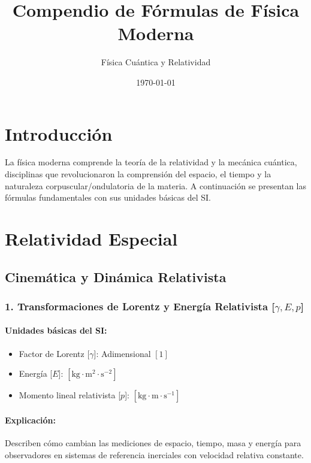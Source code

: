 \documentclass[12pt,a4paper]{article}
\title{\textbf{Compendio de Fórmulas de Física Moderna}}
\author{Física Cuántica y Relatividad}
\date{\today}
\begin{document}
\maketitle

\section*{Introducción}
La física moderna comprende la teoría de la relatividad y la mecánica cuántica, disciplinas que revolucionaron la comprensión del espacio, el tiempo y la naturaleza corpuscular/ondulatoria de la materia. A continuación se presentan las fórmulas fundamentales con sus unidades básicas del SI.

\section{Relatividad Especial}

\subsection{Cinemática y Dinámica Relativista}

\subsubsection*{1. Transformaciones de Lorentz y Energía Relativista [$\gamma, E, p$]}
\paragraph*{Unidades básicas del SI:}
\begin{itemize}
    \item Factor de Lorentz [$\gamma$]: Adimensional $[1]$
    \item Energía [$E$]: $[\text{kg}\cdot\text{m}^2\cdot\text{s}^{-2}]$
    \item Momento lineal relativista [$p$]: $[\text{kg}\cdot\text{m}\cdot\text{s}^{-1}]$
\end{itemize}
\paragraph*{Explicación:} Describen cómo cambian las mediciones de espacio, tiempo, masa y energía para observadores en sistemas de referencia inerciales con velocidad relativa constante.
\end{document}
